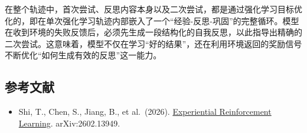 在整个轨迹中，首次尝试、反思内容本身以及二次尝试，都是通过强化学习目标优化的，即在单次强化学习轨迹内部嵌入了一个``经验-反思-巩固''的完整循环。模型在收到环境的失败反馈后，必须先生成一段结构化的自我反思，以此指导出精确的二次尝试。这意味着，模型不仅在学习``好的结果''，还在利用环境返回的奖励信号不断优化``如何生成有效的反思''这一能力。

\hypertarget{ux53c2ux8003ux6587ux732e-114}{%
\subsection{参考文献}\label{ux53c2ux8003ux6587ux732e-114}}

\begin{itemize}
\tightlist
\item
  Shi, T., Chen, S., Jiang, B., et al.~(2026). \href{https://arxiv.org/abs/2602.13949}{Experiential Reinforcement Learning}. arXiv:2602.13949.
\end{itemize}

\clearpage
